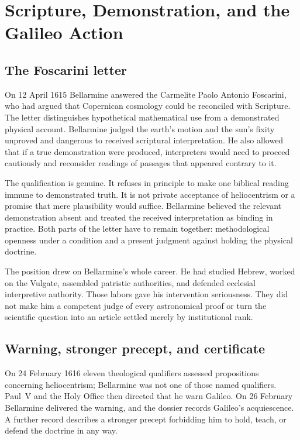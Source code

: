 \section{Scripture, Demonstration, and the Galileo Action}

\subsection{The Foscarini letter}

On 12 April 1615 Bellarmine answered the Carmelite Paolo Antonio Foscarini, who
had argued that Copernican cosmology could be reconciled with Scripture.  The
letter distinguishes hypothetical mathematical use from a demonstrated
physical account.  Bellarmine judged the earth's motion and the sun's fixity
unproved and dangerous to received scriptural interpretation.  He also allowed
that if a true demonstration were produced, interpreters would need to proceed
cautiously and reconsider readings of passages that appeared contrary to it.

The qualification is genuine.  It refuses in principle to make one biblical
reading immune to demonstrated truth.  It is not private acceptance of
heliocentrism or a promise that mere plausibility would suffice.  Bellarmine
believed the relevant demonstration absent and treated the received
interpretation as binding in practice.  Both parts of the letter have to remain
together: methodological openness under a condition and a present judgment
against holding the physical doctrine.

The position drew on Bellarmine's whole career.  He had studied Hebrew, worked
on the Vulgate, assembled patristic authorities, and defended ecclesial
interpretive authority.  Those labors gave his intervention seriousness.  They
did not make him a competent judge of every astronomical proof or turn the
scientific question into an article settled merely by institutional rank.

\subsection{Warning, stronger precept, and certificate}

On 24 February 1616 eleven theological qualifiers assessed propositions
concerning heliocentrism; Bellarmine was not one of those named qualifiers.
Paul~V and the Holy Office then directed that he warn Galileo.  On 26 February
Bellarmine delivered the warning, and the dossier records Galileo's
acquiescence.  A further record describes a stronger precept forbidding him to
hold, teach, or defend the doctrine in any way.

